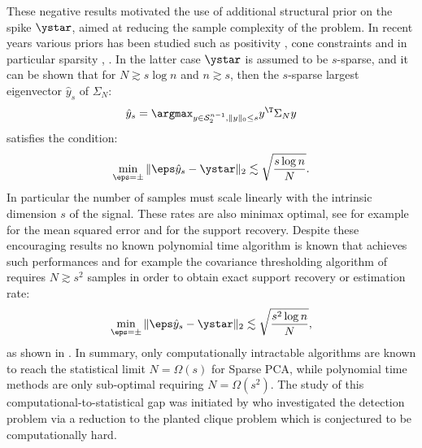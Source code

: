 These negative results motivated the use of additional 
structural prior on the spike $\ystar$, aimed at reducing
the sample complexity of the problem. In recent years 
various priors has been studied such as
positivity \citep{montanari2015non}, cone constraints \citep{deshpande2014cone} 
and in particular sparsity \citep{johnstone2009}, \citep{zou2006sparse}. 
In the latter case $\ystar$
is assumed to be  $s$-sparse,
and it can be shown that for $N \gtrsim s \log n$
and $n \gtrsim s$,
then the $s$-sparse largest eigenvector $\hat{y}_s$ of $\Sigma_N$:
\[
\hat{y}_s = \argmax_{y \in \mathcal{S}_2^{n-1}, \|y\|_0 \leq s} y^\T \Sigma_N y
\]
satisfies the condition:
\[
\min_{\eps = \pm} \|\eps \hat{y}_s - \ystar \|_2 \lesssim \sqrt{\frac{s \log n}{N}}.
\]
In particular the number of samples must scale linearly 
with the intrinsic dimension $s$ of the signal. 
These rates are also minimax optimal, see for example 
\citep{vu2012minimax} for the mean squared error 
and \citep{amini2008high} for the support recovery.
Despite these encouraging results no known 
polynomial time algorithm is known that 
achieves such performances and for example 
the covariance thresholding algorithm of \cite{krauthgamer2015semidefinite}
requires $N \gtrsim s^2$ samples 
in order to obtain exact support recovery or estimation rate:
\[
\min_{\eps = \pm} \|\eps \hat{y}_s - \ystar \|_2 \lesssim \sqrt{\frac{s^2 \log n}{N}},	
\]
as shown in  \cite{deshpande2014sparse}. 
In summary, only computationally intractable algorithms 
are known to reach  the statistical limit $N =  \Omega(s)$ for Sparse PCA, 
while polynomial time methods are only sub-optimal requiring $N = \Omega(s^2)$. 
The study of this computational-to-statistical  gap was initiated by \cite{berthet2013computational} who investigated the detection problem via a reduction to the planted clique problem
which is conjectured to be computationally hard.

